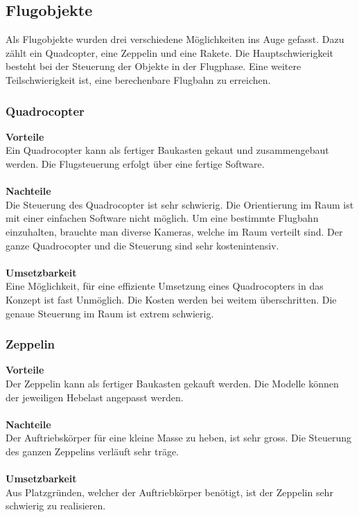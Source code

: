 \subsection{Flugobjekte}
Als Flugobjekte wurden drei verschiedene Möglichkeiten ins Auge gefasst. Dazu zählt ein Quadcopter, eine Zeppelin und eine Rakete. Die Hauptschwierigkeit besteht bei der Steuerung der Objekte in der Flugphase. Eine weitere Teilschwierigkeit ist, eine berechenbare Flugbahn zu erreichen. 

\subsubsection{Quadrocopter}
\textbf{Vorteile}\\
Ein Quadrocopter kann als fertiger Baukasten gekaut und zusammengebaut werden. Die Flugsteuerung erfolgt über eine fertige Software.\\
\\
\textbf{Nachteile}\\
Die Steuerung des Quadrocopter ist sehr schwierig. Die Orientierung im Raum ist mit einer einfachen Software nicht möglich. Um eine bestimmte Flugbahn einzuhalten, brauchte man diverse Kameras, welche im Raum verteilt sind. Der ganze Quadrocopter und die Steuerung sind sehr kostenintensiv.\\
\\
\textbf{Umsetzbarkeit}\\
Eine Möglichkeit, für eine effiziente Umsetzung eines Quadrocopters in das Konzept ist fast 
Unmöglich. Die Kosten werden bei weitem überschritten. Die genaue Steuerung im Raum ist extrem schwierig. 

\subsubsection{Zeppelin}
\textbf{Vorteile}\\
Der Zeppelin kann als fertiger Baukasten gekauft werden. Die Modelle können der jeweiligen Hebelast angepasst werden. \\
\\
\textbf{Nachteile}\\
Der Auftriebskörper für eine kleine Masse zu heben, ist sehr gross. Die Steuerung des ganzen Zeppelins verläuft sehr träge.\\
\\
\textbf{Umsetzbarkeit}\\
Aus Platzgründen, welcher der Auftriebkörper benötigt, ist der Zeppelin sehr schwierig zu realisieren. \\
\\
